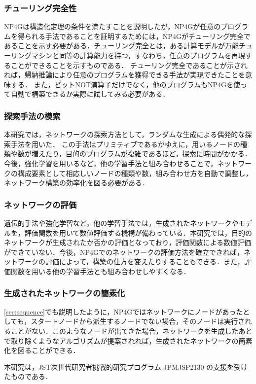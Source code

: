 \documentclass[exploratorypaper]{jsaiart} %
\begin{document}
\subsubsection{チューリング完全性}
NP4Gは構造化定理の条件を満たすことを説明したが，NP4Gが任意のプログラムを得られる手法であることを証明するためには，NP4Gがチューリング完全であることを示す必要がある．チューリング完全とは，ある計算モデルが万能チューリングマシンと同等の計算能力を持つ，すなわち，任意のプログラムを再現することができることを示すものである．
チューリング完全であることが示されれば，帰納推論により任意のプログラムを獲得できる手法が実現できたことを意味する．
また，ビットNOT演算子だけでなく，他のプログラムもNP4Gを使って自動で構築できるか実際に試してみる必要がある．
\subsubsection{探索手法の模索}
本研究では，ネットワークの探索方法として，ランダムな生成による偶発的な探索手法を用いた．
この手法はプリミティブであるがゆえに，用いるノードの種類や数が増えたり，目的のプログラムが複雑であるほど，探索に時間がかかる．
今後，強化学習を用いるなど，他の学習手法と組み合わせることで，ネットワークの構成要素として相応しいノードの種類や数，組み合わせ方を自動で調整し，ネットワーク構築の効率化を図る必要がある．
\subsubsection{ネットワークの評価}
遺伝的手法や強化学習など，他の学習手法では，生成されたネットワークやモデルを，評価関数を用いて数値評価する機構が備わっている．本研究では，目的のネットワークが生成されたか否かの評価となっており，評価関数による数値評価ができていない．今後，NP4Gでのネットワークの評価方法を確立できれば，ネットワークの評価によって，構築の仕方を変えたりすることもできる．また，評価関数を用いる他の学習手法とも組み合わせしやすくなる．
\subsubsection{生成されたネットワークの簡素化}
\ref{sec:sequence}でも説明したように，NP4Gではネットワークにノードがあったとしても，スタートノードから派生するノードでない場合，そのノードは実行されることがない．このようなノードが出てきた場合，ネットワークを生成したあとで取り除くようなアルゴリズムが提案されれば，生成されたネットワークの簡素化を図ることができる．
\begin{acknowledgment}
本研究は，JST次世代研究者挑戦的研究プログラム JPMJSP2130 の支援を受けたものである．
\end{acknowledgment}
\end{document}
